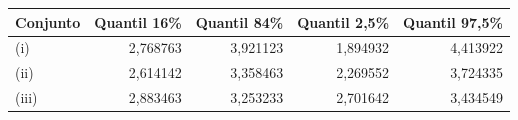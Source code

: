 \begin{tabular}{lrrrr}
\toprule
Conjunto & Quantil 16\% & Quantil 84\% & Quantil 2,5\% & Quantil 97,5\% \\
\midrule
(i) & 2,768763 & 3,921123 & 1,894932 & 4,413922 \\
(ii) & 2,614142 & 3,358463 & 2,269552 & 3,724335 \\
(iii) & 2,883463 & 3,253233 & 2,701642 & 3,434549 \\
\bottomrule
\end{tabular}
